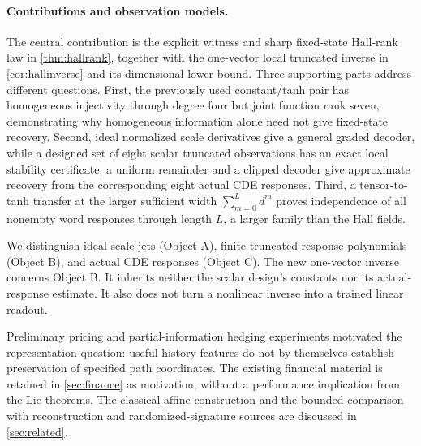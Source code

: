 \documentclass[11pt,a4paper]{article}
\numberwithin{equation}{section}
\theoremstyle{definition}
\theoremstyle{remark}
\begin{document}
\paragraph{Contributions and observation models.}
The central contribution is the explicit witness and sharp fixed-state
Hall-rank law in \cref{thm:hallrank}, together with the one-vector local
truncated inverse in \cref{cor:hallinverse} and its dimensional lower
bound. Three supporting parts address different questions. First, the
previously used constant/tanh pair has homogeneous injectivity through
degree four but joint function rank seven, demonstrating why homogeneous
information alone need not give fixed-state recovery. Second, ideal
normalized scale derivatives give a general graded decoder, while a
designed set of eight scalar truncated observations has an exact local
stability certificate; a uniform remainder and a clipped decoder give
approximate recovery from the corresponding eight actual CDE responses.
Third, a tensor-to-tanh transfer at the larger sufficient width
$\sum_{m=0}^L d^m$ proves independence of all nonempty word responses
through length $L$, a larger family than the Hall fields.

We distinguish ideal scale jets (Object A), finite truncated response
polynomials (Object B), and actual CDE responses (Object C). The new
one-vector inverse concerns Object B. It inherits neither the scalar
design's constants nor its actual-response estimate. It also does not
turn a nonlinear inverse into a trained linear readout.

Preliminary pricing and partial-information hedging experiments
motivated the representation question: useful history features do not
by themselves establish preservation of specified path coordinates.
The existing financial material is retained in \cref{sec:finance} as
motivation, without a performance implication from the Lie theorems.
The classical affine construction and the bounded comparison with
reconstruction and randomized-signature sources are discussed in
\cref{sec:related}.
\end{document}
